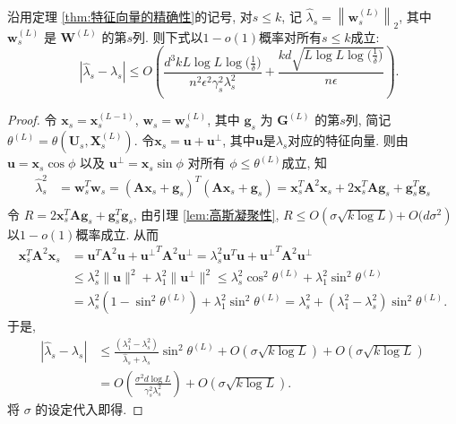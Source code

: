 \begin{thm}[特征值的精确性]\label{thm:特征值的精确性}
	沿用定理 \ref{thm:特征向量的精确性}的记号, 对$s\le k$, 记 $\hat{\lambda}_s = \left\|\mathbf{w}_s^{(L)}\right\|_2$, 其中 $\mathbf{w}_s^{(L)}$ 是 $\mathbf{W}^{(L)}$ 的第$s$列. 则下式以$1-o(1)$概率对所有$s \le k$成立:
	\begin{equation*}
		\quad |\hat{\lambda}_s - \lambda_s| \le O\left( \frac{d^3kL\log L\log\bigl(\frac{1}{\delta}\bigr)}{n^2\epsilon^2\gamma_s^2\lambda_s^2} +  \frac{kd\sqrt{L\log L \log\bigl(\frac{1}{\delta}\bigr)}}{n\epsilon}\right).
	\end{equation*}
\end{thm}
\begin{proof}
  令 $\mathbf{x}_s = \mathbf{x}_s^{(L-1)}$, $\mathbf{w}_s = \mathbf{w}_s^{(L)}$, 其中 $\mathbf{g}_s$ 为 $\mathbf{G}^{(L)}$ 的第$s$列, 简记 $\theta^{(L)} = \theta(\mathbf{U}_s, \mathbf{X}_s^{(L)})$. 令$\mathbf{x}_s =\mathbf{u}+\mathbf{u}^{\bot}$, 其中$\mathbf{u}$是$\lambda_s$对应的特征向量. 则由 $\mathbf{u}=\mathbf{x}_s\cos\phi$ 以及 $\mathbf{u}^{\bot} = \mathbf{x}_s\sin\phi$ 对所有 $\phi\le \theta^{(L)}$成立, 知
  \begin{equation*}
  	\begin{split}
  		\hat{\lambda}_s^2 &= \mathbf{w}_s^T \mathbf{w}_s =(\mathbf{A}\mathbf{x}_s+\mathbf{g}_s)^T (\mathbf{A}\mathbf{x}_s+\mathbf{g}_s) =\mathbf{x}_s^T \mathbf{A}^2 \mathbf{x}_s+2\mathbf{x}_s^T \mathbf{A}\mathbf{g}_s+\mathbf{g}_s^T\mathbf{g}_s\\
          \end{split}
          \end{equation*}
  令 $R=2\mathbf{x}_s^T \mathbf{A}\mathbf{g}_s+\mathbf{g}_s^T\mathbf{g}_s$, 由引理 \ref{lem:高斯凝聚性}, $R\le O\left(\sigma\sqrt{k\log L})+O(d\sigma^2\right)$以$1-o(1)$概率成立. 从而
  \begin{equation*}
     \begin{split}
  		\mathbf{x}_s^T \mathbf{A}^2 \mathbf{x}_s&= \mathbf{u}^T \mathbf{A}^2 \mathbf{u}+ \mathbf{u^{\bot}}^T \mathbf{A}^2 \mathbf{u^{\bot}} = \lambda_s^2 \mathbf{u}^T \mathbf{u}+ \mathbf{u^{\bot}}^T \mathbf{A}^2 \mathbf{u^{\bot}}\\
  		&\le \lambda_s^2 \|\mathbf{u}\|^2+ \lambda_1^2 \|\mathbf{u}^{\bot}\|^2 \le \lambda_s^2 \cos^2\theta^{(L)}+ \lambda_1^2 \sin^2\theta^{(L)}\\
  		&= \lambda_s^2 (1-\sin^2\theta^{(L)})+ \lambda_1^2 \sin^2\theta^{(L)} = \lambda_s^2 + (\lambda_1^2- \lambda_s^2) \sin^2\theta^{(L)}.
    \end{split}
  \end{equation*}
  于是,
  \begin{equation*}
  	\begin{split}
  		|\hat{\lambda}_s - \lambda_s| &\le\frac{(\lambda_1^2- \lambda_s^2)} {\hat{\lambda}_s + \lambda_s} \sin^2\theta^{(L)}+O\left(\sigma\sqrt{k\log L}\right) + O\left(\sigma\sqrt{k\log L}\right)\\
  		 &= O\left(\frac{ \sigma^2 d\log L}{\gamma_s^2\lambda_s^2}\right) +O\left(\sigma\sqrt{k\log L}\right).
  	\end{split}
  \end{equation*}
  将 $\sigma$ 的设定代入即得.
\end{proof}
